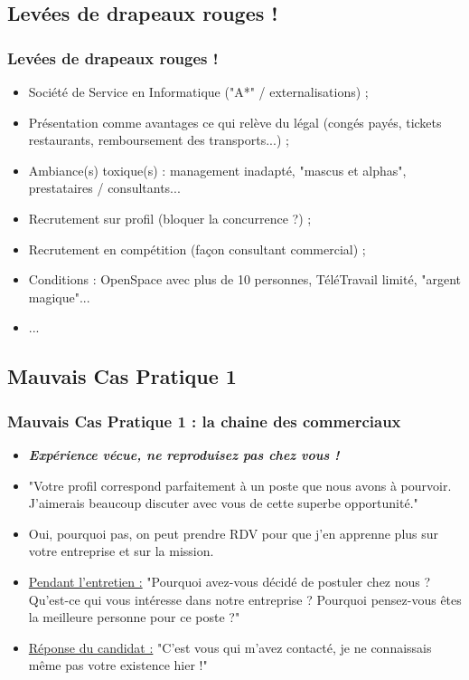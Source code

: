 \documentclass[slidetop,11pt]{beamer}
\begin{document}
\subsection{Lev{\'e}es de drapeaux rouges !}
\begin{frame}
	\frametitle{Lev{\'e}es de drapeaux rouges !}
	\begin{itemize}
		\item Soci{\'e}t{\'e} de Service en Informatique ("A*" / externalisations) ; 
		\item Pr{\'e}sentation comme avantages ce qui rel{\`e}ve du l{\'e}gal (cong{\'e}s pay{\'e}s, tickets restaurants, remboursement des transports...) ; 
		\item Ambiance(s) toxique(s) : management inadapt{\'e}, "mascus et alphas", prestataires / consultants...
		\item Recrutement sur profil (bloquer la concurrence ?) ; 
		\item Recrutement en comp{\'e}tition (fa\c{c}on consultant commercial) ; 
		\item Conditions : OpenSpace avec plus de 10 personnes, T{\'e}l{\'e}Travail limit{\'e}, "argent magique"...
		\item ... 
	\end{itemize}
\end{frame}

\subsection{Mauvais Cas Pratique 1}
\begin{frame}
	\frametitle{Mauvais Cas Pratique 1 : la chaine des commerciaux}
	\begin{itemize}
		\item \textbf{\emph{Exp{\'e}rience v{\'e}cue, ne reproduisez pas chez vous !}}
		\item "Votre profil correspond parfaitement {\`a} un poste que nous avons {\`a} pourvoir. J'aimerais beaucoup discuter avec vous de cette superbe opportunit{\'e}."
		\item Oui, pourquoi pas, on peut prendre RDV pour que j'en apprenne plus sur votre entreprise et sur la mission.
		\item \underline{Pendant l'entretien :} "Pourquoi avez-vous d{\'e}cid{\'e} de postuler chez nous ? Qu'est-ce qui vous int{\'e}resse dans notre entreprise ? Pourquoi pensez-vous {\^e}tes la meilleure personne pour ce poste ?"
		\item \underline{R{\'e}ponse du candidat :} "C'est vous qui m'avez contact{\'e}, je ne connaissais m{\^e}me pas votre existence hier !"
	\end{itemize}
\end{frame}
\end{document}
